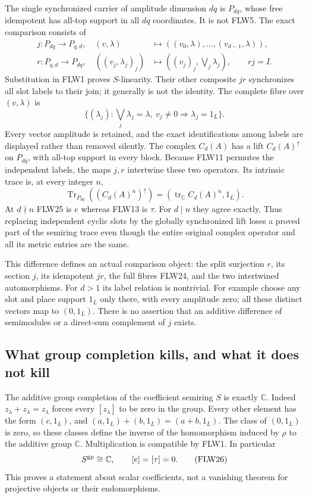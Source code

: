 The single synchronized carrier of amplitude dimension $dq$ is
$P_{dq}$, whose free idempotent has all-top support in all $dq$
coordinates. It is not FLW5. The exact comparison consists of
\[
\begin{split}
 j:P_{dq}\longrightarrow P_{q,d},\quad
           (v,\lambda)&\longmapsto((v_0,\lambda),\ldots,(v_{d-1},\lambda)),\\
 r:P_{q,d}\longrightarrow P_{dq},\quad
           ((v_j,\lambda_j)_j)&\longmapsto
                         ((v_j)_j,\bigvee_j\lambda_j),\qquad rj=I.
\end{split}
\tag{FLW23}
\]
Substitution in FLW1 proves $S$-linearity. Their other composite
$jr$ synchronizes all slot labels to their join; it generally is
not the identity. The complete fibre over $(v,\lambda)$ is
\[
 \{(\lambda_j):\bigvee_j\lambda_j=\lambda,
                       \ v_j\ne0\Rightarrow\lambda_j=1_L\}.
 \tag{FLW24}
\]
Every vector amplitude is retained, and the exact identifications
among labels are displayed rather than removed silently.
The complex $C_d(A)$ has a lift $C_d(A)^\uparrow$ on $P_{dq}$,
with all-top support in every block. Because FLW11 permutes the
independent labels, the maps $j,r$ intertwine these two operators.
Its intrinsic trace is, at every integer $n$,
\[
 \operatorname{Tr}_{P_{dq}}((C_d(A)^n)^\uparrow)
                   =(\operatorname{tr}_{\mathbb C}C_d(A)^n,1_L).
 \tag{FLW25}
\]
At $d\nmid n$ FLW25 is $e$ whereas FLW13 is $\tau$.
For $d\mid n$ they agree exactly. Thus replacing independent cyclic
slots by the globally synchronized lift loses a proved part of the
semiring trace even though the entire original complex operator
and all its metric entries are the same.

This difference defines an actual comparison object: the split
surjection $r$, its section $j$, its idempotent $jr$, the full
fibres FLW24, and the two intertwined automorphisms.
For $d>1$ its label relation is nontrivial. For example choose any
slot and place support $1_L$ only there, with every amplitude zero;
all these distinct vectors map to $(0,1_L)$.
There is no assertion that an additive difference of semimodules
or a direct-sum complement of $j$ exists.

\subsection{What group completion kills, and what it does not kill}

The additive group completion of the coefficient semiring $S$ is
exactly $\mathbb C$. Indeed $z_\lambda+z_\lambda=z_\lambda$ forces
every $[z_\lambda]$ to be zero in the group. Every other element
has the form $(c,1_L)$, and
$(a,1_L)+(b,1_L)=(a+b,1_L)$.
The class of $(0,1_L)$ is zero, so these classes define the inverse
of the homomorphism induced by $\rho$ to the additive group
$\mathbb C$. Multiplication is compatible by FLW1. In particular
\[
 S^{\rm gp}\cong\mathbb C,\qquad [e]=[\tau]=0.
 \tag{FLW26}
\]
This proves a statement about scalar coefficients, not a vanishing
theorem for projective objects or their endomorphisms.

